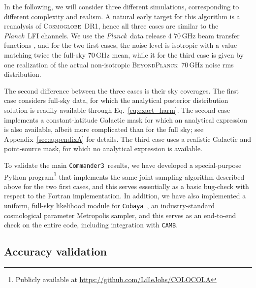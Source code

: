 \documentclass[twocolumn]{../common/aa}
\def\planck{\emph{Planck}}
\def\Planck{\emph{Planck}}
\def\commanderthree{\texttt{Commander3}}
\def\cobaya{\texttt{Cobaya}}
\def\camb{\texttt{CAMB}}
\newcommand{\BP}{\textsc{BeyondPlanck}}
\newcommand{\cosmoglobe}{\textsc{Cosmoglobe}}
\begin{document}
In the following, we will consider three different simulations, corresponding to different complexity and realism. A natural early target for this algorithm is a reanalysis of \cosmoglobe\ DR1, hence all three cases are similar to the \Planck\ LFI channels. We use the \planck\ data release 4 70\,GHz beam transfer functions \citep{planck2020-LVII}, and for the two first cases, the noise level is isotropic with a value matching twice the full-sky 70\,GHz mean, while it for the third case is given by one realization of the actual non-isotropic \BP\ 70\,GHz noise rms distribution.

The second difference between the three cases is their sky coverages. The first case considers full-sky data, for which the analytical posterior distribution solution is readily available through Eq.~\eqref{eq:exact_harm}. The second case implements a constant-latitude Galactic mask for which an analytical expression is also available, albeit more complicated than for the full sky; see Appendix~\ref{sec:appendixA} for details. The third case uses a realistic Galactic and point-source mask, for which no analytical expression is available. 

To validate the main \commanderthree\ results, we have developed a special-purpose Python program\footnote{Publicly available at \url{https://github.com/LilleJohs/COLOCOLA}} that implements the same joint sampling algorithm described above for the two first cases, and this serves essentially as a basic bug-check with respect to the Fortran implementation. In addition, we have also implemented a uniform, full-sky likelihood module for \cobaya\ \citep{Torrado:2020dgo}, an industry-standard cosmological parameter Metropolis sampler, and this serves as an end-to-end check on the entire code, including integration with \camb.

\subsection{Accuracy validation}
\end{document}
